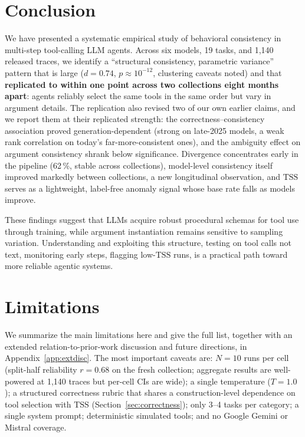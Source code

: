\documentclass[11pt]{article}
\newcommand{\tss}{\mathrm{TSS}}
\begin{document}
\section{Conclusion}

We have presented a systematic empirical study of behavioral consistency in
multi-step tool-calling LLM agents. Across six models, 19 tasks, and 1,140
released traces, we identify a ``structural consistency, parametric variance''
pattern that is large ($d = 0.74$, $p \approx 10^{-12}$, clustering caveats
noted) and that \textbf{replicated to within one point across two collections
eight months apart}: agents reliably select the same tools in the same order
but vary in argument details. The replication also revised two of our own
earlier claims, and we report them at their replicated strength: the
correctness--consistency association proved generation-dependent (strong on
late-2025 models, a weak rank correlation on today's far-more-consistent
ones), and the ambiguity effect on argument consistency shrank below
significance. Divergence concentrates early in the pipeline (62\,\%, stable
across collections), model-level consistency itself improved markedly between
collections, a new longitudinal observation, and $\tss$ serves as a
lightweight, label-free anomaly signal whose base rate falls as models
improve.

These findings suggest that LLMs acquire robust procedural schemas for tool use
through training, while argument instantiation remains sensitive to sampling
variation. Understanding and exploiting this structure, testing on tool calls not
text, monitoring early steps, flagging low-$\tss$ runs, is a practical path
toward more reliable agentic systems.

\section*{Limitations}

We summarize the main limitations here and give the full list, together with an
extended relation-to-prior-work discussion and future directions, in
Appendix~\ref{app:extdisc}. The most important caveats are: $N = 10$ runs per
cell (split-half reliability $r = 0.68$ on the fresh collection; aggregate
results are well-powered at 1,140 traces but per-cell CIs are wide); a single
temperature ($T = 1.0$); a structured correctness rubric that shares a
construction-level dependence on tool selection with $\tss$
(Section~\ref{sec:correctness}); only 3--4 tasks per category; a single system
prompt; deterministic simulated tools; and no Google Gemini or Mistral
coverage.
\end{document}
